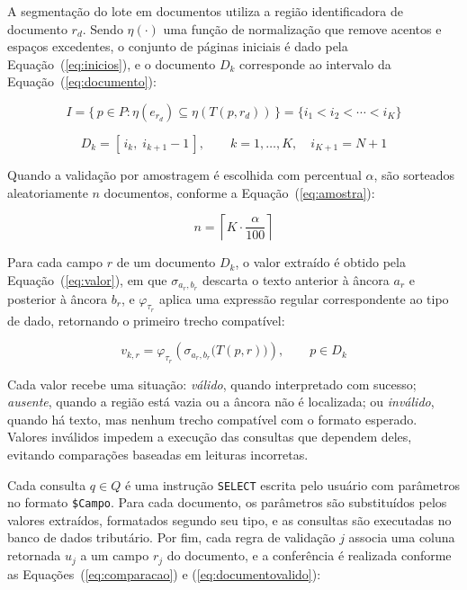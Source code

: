 \documentclass[article,12pt,oneside,a4paper,english,brazil]{abntex2}
\begin{document}
A segmentação do lote em documentos utiliza a região identificadora de documento
$r_d$. Sendo $\eta(\cdot)$ uma função de normalização que remove acentos e espaços
excedentes, o conjunto de páginas iniciais é dado pela Equação~(\ref{eq:inicios}), e o
documento $D_k$ corresponde ao intervalo da Equação~(\ref{eq:documento}):

\begin{equation}\label{eq:inicios}
I = \{\, p \in P : \eta(e_{r_d}) \subseteq \eta(T(p, r_d)) \,\} = \{i_1 < i_2 < \cdots < i_K\}
\end{equation}

\begin{equation}\label{eq:documento}
D_k = [\, i_k,\; i_{k+1} - 1 \,], \qquad k = 1, \ldots, K, \quad i_{K+1} = N + 1
\end{equation}

Quando a validação por amostragem é escolhida com percentual $\alpha$, são sorteados
aleatoriamente $n$ documentos, conforme a Equação~(\ref{eq:amostra}):

\begin{equation}\label{eq:amostra}
n = \left\lceil K \cdot \frac{\alpha}{100} \right\rceil
\end{equation}

Para cada campo $r$ de um documento $D_k$, o valor extraído é obtido pela
Equação~(\ref{eq:valor}), em que $\sigma_{a_r, b_r}$ descarta o texto anterior à âncora
$a_r$ e posterior à âncora $b_r$, e $\varphi_{\tau_r}$ aplica uma expressão regular
correspondente ao tipo de dado, retornando o primeiro trecho compatível:

\begin{equation}\label{eq:valor}
v_{k,r} = \varphi_{\tau_r}\!\left(\sigma_{a_r, b_r}\big(T(p, r)\big)\right), \qquad p \in D_k
\end{equation}

Cada valor recebe uma situação: \emph{válido}, quando interpretado com sucesso;
\emph{ausente}, quando a região está vazia ou a âncora não é localizada; ou
\emph{inválido}, quando há texto, mas nenhum trecho compatível com o formato esperado.
Valores inválidos impedem a execução das consultas que dependem deles, evitando
comparações baseadas em leituras incorretas.

Cada consulta $q \in Q$ é uma instrução \texttt{SELECT} escrita pelo usuário com
parâmetros no formato \texttt{\$Campo}. Para cada documento, os parâmetros são
substituídos pelos valores extraídos, formatados segundo seu tipo, e as consultas são
executadas no banco de dados tributário. Por fim, cada regra de validação $j$
associa uma coluna retornada $u_j$ a um campo $r_j$ do documento, e a conferência é
realizada conforme as Equações~(\ref{eq:comparacao}) e (\ref{eq:documentovalido}):
\end{document}
